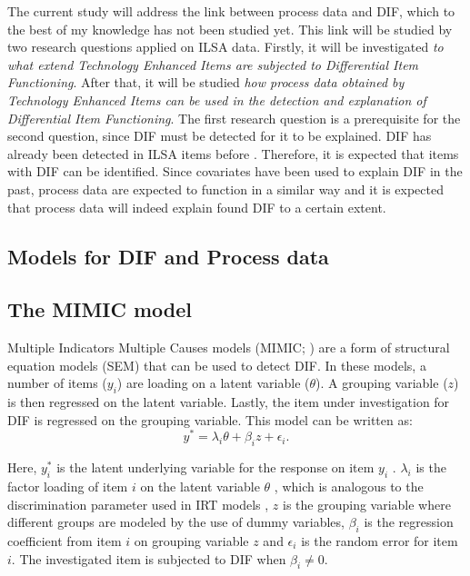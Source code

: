 \documentclass{article}
\begin{document}
The current study will address the link between process data and DIF, which to the best of my knowledge has not been studied yet. This link will be studied by two research questions applied on ILSA data. Firstly, it will be investigated \textit{to what extend Technology Enhanced Items are subjected to Differential Item Functioning}. After that, it will be studied \textit{how process data obtained by Technology Enhanced Items can be used in the detection and explanation of Differential Item Functioning}. The first research question is a prerequisite for the second question, since DIF must be detected for it to be explained. DIF has already been detected in ILSA items before \parencite{ozdemir2015comparison, choi2014dif, avcsar2021cross, feskens2019differential}. Therefore, it is expected that items with DIF can be identified. Since covariates have been used to explain DIF in the past, process data are expected to function in a similar way and it is expected that process data will indeed explain found DIF to a certain extent. 

\vspace{1cm}

\begin{center}
 \section*{Models for DIF and Process data}   
\end{center}

\subsection*{The MIMIC model}
Multiple Indicators Multiple Causes models (MIMIC; \cite{joreskog1975estimation}) are a form of structural equation models (SEM) that can be used to detect DIF. In these models, a number of items ($y_i$) are loading on a latent variable ($\theta$). A grouping variable ($z$) is then regressed on the latent variable. Lastly, the item under investigation for DIF is regressed on the grouping variable. This model can be written as:
\begin{equation}
    y^* = \lambda_i \theta + \beta_i z + \epsilon_i.
\end{equation}

Here, $y_i^*$ is the latent underlying variable for the response on item $y_i$ \parencite{wirth2007item}. $\lambda_i$ is the factor loading of item $i$ on the latent variable $\theta$ , which is analogous to the discrimination parameter used in IRT models \parencite{bulut2017detecting}, $z$ is the grouping variable where different groups are modeled by the use of dummy variables, $\beta_i$ is the regression coefficient from item $i$ on grouping variable $z$ and $\epsilon_i$ is the random error for item $i$. The investigated item is subjected to DIF when $\beta_i \neq 0$. 
\end{document}
